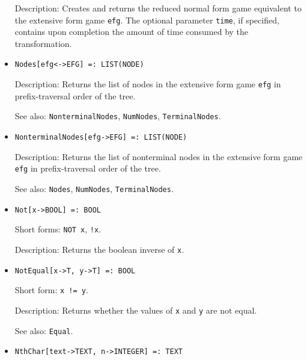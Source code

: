 \begin{itemize}
\bd
\item
[Description:] Creates and returns the reduced normal form game equivalent
to the extensive form game \verb+efg+.  The optional parameter \verb+time+,
if specified, contains upon completion the amount of time consumed by
the transformation.
\ed

\item
\protect \large \begin{verbatim} 
Nodes[efg<->EFG] =: LIST(NODE)
\end{verbatim}\normalsize

\bd
\item
[Description:] Returns the list of nodes in the extensive form game
\verb+efg+ in prefix-traversal order of the tree.
\item
[See also:] {\tt NonterminalNodes}, {\tt NumNodes}, {\tt TerminalNodes}.
\ed


\item
\protect \large \begin{verbatim} 
NonterminalNodes[efg->EFG] =: LIST(NODE)
\end{verbatim}\normalsize

\bd
\item
[Description:] Returns the list of nonterminal nodes in the extensive form
game \verb+efg+ in prefix-traversal order of the tree.
\item
[See also:] {\tt Nodes}, {\tt NumNodes}, {\tt TerminalNodes}.
\ed

\item
\protect \large \begin{verbatim}
Not[x->BOOL] =: BOOL
\end{verbatim}\normalsize

\bd
\item
[Short forms:] \verb+NOT x+, \verb+!x+.
\item
[Description:] Returns the boolean inverse of \verb+x+.
\ed

\item
\protect \large \begin{verbatim}
NotEqual[x->T, y->T] =: BOOL
\end{verbatim}\normalsize

\bd
\item
[Short form:] \verb+x != y+.
\item
[Description:] Returns whether the values of \verb+x+ and \verb+y+ are
not equal.
\item
[See also:] {\tt Equal}.
\ed

\item
\protect \large \begin{verbatim}
NthChar[text->TEXT, n->INTEGER] =: TEXT
\end{verbatim}\normalsize


\end{itemize}
